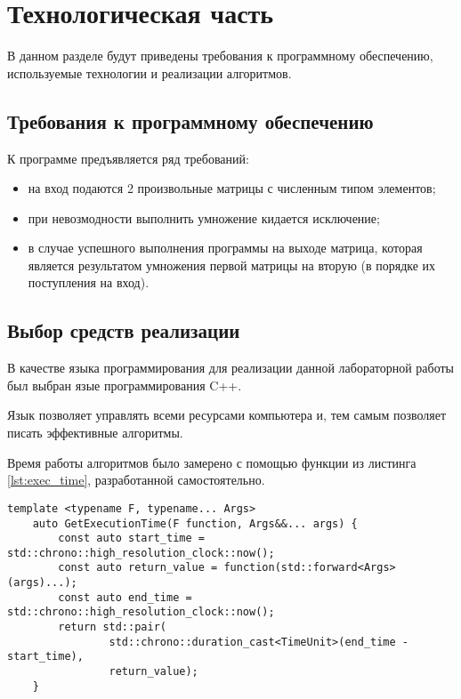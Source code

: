 \chapter{Технологическая часть}

В данном разделе будут приведены требования к программному обеспечению, используемые технологии и реализации алгоритмов.

\section{Требования к программному обеспечению}

К программе предъявляется ряд требований:

\begin{itemize}
	\item на вход подаются 2 произвольные матрицы с численным типом элементов;
	\item при невозмодности выполнить умножение кидается исключение;
	\item в случае успешного выполнения программы на выходе матрица, которая является результатом умножения первой матрицы на вторую (в порядке их поступления на вход).
\end{itemize}

\section{Выбор средств реализации}

В качестве языка программирования для реализации данной лабораторной работы был выбран язые программирования C++\cite{pythonlang}.

Язык позволяет управлять всеми ресурсами компьютера и, тем самым позволяет
писать эффективные алгоритмы.

Время работы алгоритмов было замерено с помощью функции из листинга \ref{lst:exec_time}, разработанной самостоятельно.

\clearpage
\begin{lstlisting}[label=lst:exec_time, caption=Функция для замера времени исполнения функции]
	template <typename F, typename... Args>
	auto GetExecutionTime(F function, Args&&... args) {
		const auto start_time = std::chrono::high_resolution_clock::now();
		const auto return_value = function(std::forward<Args>(args)...);
		const auto end_time = std::chrono::high_resolution_clock::now();
		return std::pair(
				std::chrono::duration_cast<TimeUnit>(end_time - start_time),
				return_value);
	}
\end{lstlisting}

